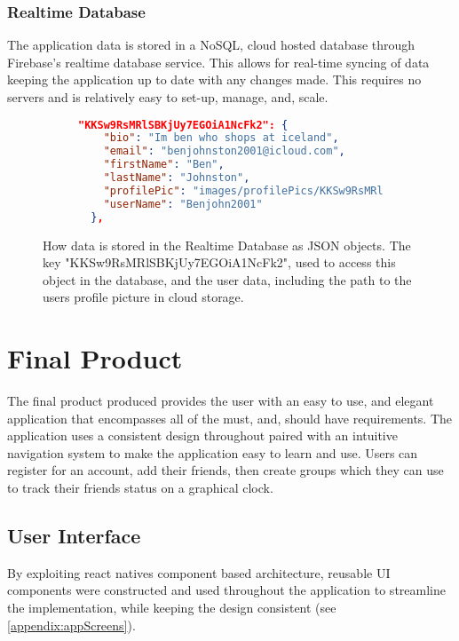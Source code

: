 \subsubsection{Realtime Database}
The application data is stored in a NoSQL, cloud hosted  database through Firebase's realtime database service. This allows for real-time syncing of data keeping the application up to date with any changes made. This requires no servers and is relatively easy to set-up, manage, and, scale.
\begin{figure}[!htbp]
\centering
\begin{subfigure}[b]{0.85\textwidth}
\begin{lstlisting}[language=json]
"KKSw9RsMRlSBKjUy7EGOiA1NcFk2": {
    "bio": "Im ben who shops at iceland",
    "email": "benjohnston2001@icloud.com",
    "firstName": "Ben",
    "lastName": "Johnston",
    "profilePic": "images/profilePics/KKSw9RsMRlSBKjUy7EGOiA1NcFk2",
    "userName": "Benjohn2001"
  },
\end{lstlisting}
\end{subfigure}
\caption{How data is stored in the Realtime Database as JSON objects. The key "KKSw9RsMRlSBKjUy7EGOiA1NcFk2", used to access this object in the database, and the user data, including the path to the users profile picture in cloud storage.}
\end{figure}

\section{Final Product}
The final product produced provides the user with an easy to use, and elegant application that encompasses all of the must, and, should have requirements. The application uses a consistent design throughout paired with an intuitive navigation system to make the  application easy to learn and use. Users can register for an account, add their friends, then create groups which they can use to track their friends status on a graphical clock.
\subsection{User Interface}
By exploiting react natives component based architecture, reusable UI components were constructed and used throughout the application to streamline the implementation, while keeping the design consistent (see \ref{appendix:appScreens}).
